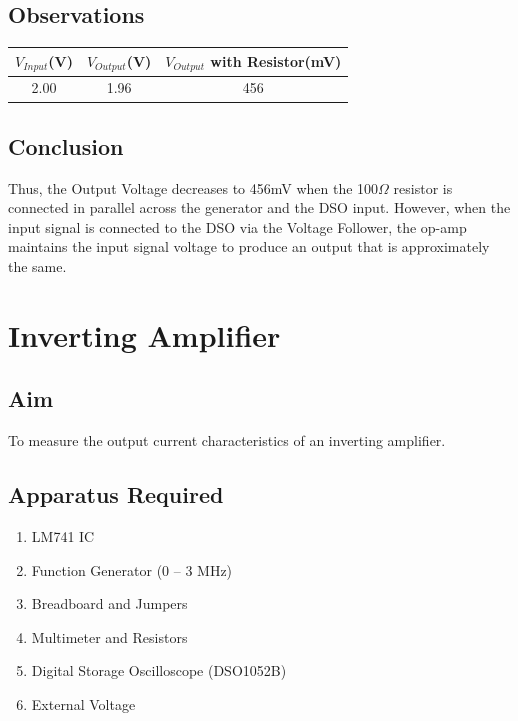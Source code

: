 \documentclass{article}
\begin{document}
\subsection{Observations}
\begin{center}
\begin{tabular}{|c|c|c|}
\hline
    $V_{Input}$(V) & $V_{Output}$(V) & $V_{Output}$ with Resistor(mV) \\
    \hline
    2.00 & 1.96 & 456\\
\hline
\end{tabular}
\end{center}
\subsection{Conclusion}
Thus, the Output Voltage decreases to 456mV when the 100$\Omega$ resistor is connected in parallel across the generator and the DSO input. However, when the input signal is connected to the DSO via the Voltage Follower, the op-amp maintains the input signal voltage to produce an output that is approximately the same.
\newpage
\section{Inverting Amplifier}
\subsection{Aim}
To measure the output current characteristics of an inverting amplifier.
\subsection{Apparatus Required}
\begin{enumerate}
    \item LM741 IC
    \item Function Generator (0 – 3 MHz)
    \item Breadboard and Jumpers
    \item Multimeter and Resistors
    \item Digital Storage Oscilloscope (DSO1052B)
    \item External Voltage
\end{enumerate}
\end{document}

